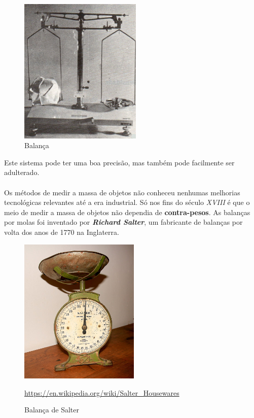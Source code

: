 \begin{minipage}[!b]{0.45\linewidth}
	\begin{figure}[H]
		\centering
		\includegraphics[height=7cm]{./image/PESTA/general/balanca_4.jpg}
		\caption{Balança}
		\label{balanca_4}
	\end{figure}
\end{minipage}
\newline
\newline
\newline
Este sistema pode ter uma boa precisão, mas também pode facilmente ser adulterado.
\\
\\
Os métodos de medir a massa de objetos não conheceu nenhumas melhorias tecnológicas relevantes até a era industrial. Só nos fins do século \textit{XVIII} é que o meio de medir a massa de objetos não dependia de \textbf{contra-pesos}. As balanças por molas foi inventado por \textbf{\textit{Richard Salter}}, um fabricante de balanças por volta dos anos de 1770 na Inglaterra.\\
\begin{figure}[H]
	\centering
	\includegraphics[height=7cm]{./image/PESTA/general/Weigh_Scale_Salter_1.jpg}
	\caption{Balança de Salter}
	\url{https://en.wikipedia.org/wiki/Salter_Housewares}
	\label{Weigh_Scale_Salter_1}
\end{figure}
